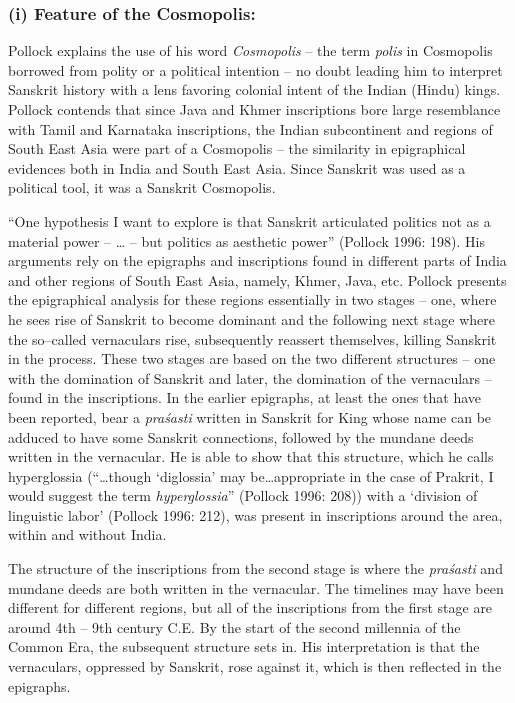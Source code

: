 \subsubsection*{(i) Feature of the Cosmopolis:}

Pollock explains the use of his word \textit{Cosmopolis} – the term \textit{polis} in Cosmopolis borrowed from polity or a political intention – no doubt leading him to interpret Sanskrit history with a lens favoring colonial intent of the Indian (Hindu) kings. Pollock contends that since Java and Khmer inscriptions bore large resemblance with Tamil and Karnataka inscriptions, the Indian subcontinent and regions of South East Asia were part of a Cosmopolis – the similarity in epigraphical evidences both in India and South East Asia. Since Sanskrit was used as a political tool, it was a Sanskrit Cosmopolis.

“One hypothesis I want to explore is that Sanskrit articulated politics not as a material power – … – but politics as aesthetic power” (Pollock 1996: 198). His arguments rely on the epigraphs and inscriptions found in different parts of India and other regions of South East Asia, namely, Khmer, Java, etc. Pollock presents the epigraphical analysis for these regions essentially in two stages – one, where he sees rise of Sanskrit to become dominant and the following next stage where the so–called vernaculars rise, subsequently reassert themselves, killing Sanskrit in the process. These two stages are based on the two different structures – one with the domination of Sanskrit and later, the domination of the vernaculars – found in the inscriptions. In the earlier epigraphs, at least the ones that have been reported, bear a \textit{praśasti} written in Sanskrit for King whose name can be adduced to have some Sanskrit connections, followed by the mundane deeds written in the vernacular. He is able to show that this structure, which he calls hyperglossia (“…though ‘diglossia’ may be…appropriate in the case of Prakrit, I would suggest the term \textit{hyperglossia}” (Pollock 1996: 208)) with a ‘division of linguistic labor’ (Pollock 1996: 212), was present in inscriptions around the area, within and without India.

The structure of the inscriptions from the second stage is where the \textit{praśasti} and mundane deeds are both written in the vernacular. The timelines may have been different for different regions, but all of the inscriptions from the first stage are around 4th – 9th century C.E. By the start of the second millennia of the Common Era, the subsequent structure sets in. His interpretation is that the vernaculars, oppressed by Sanskrit, rose against it, which is then reflected in the epigraphs.

